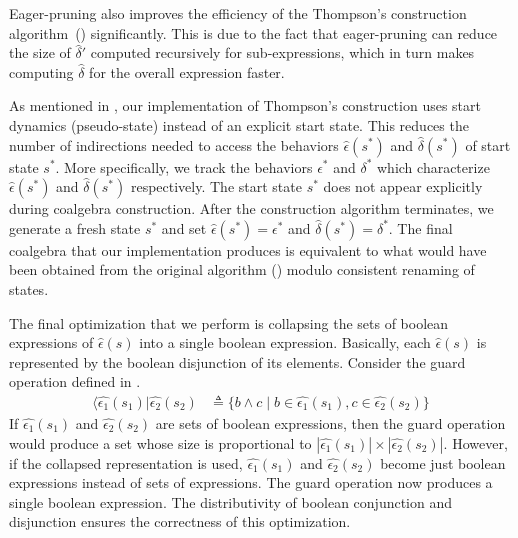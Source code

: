 \documentclass[conference]{IEEEtran}
\begin{document}
Eager-pruning also improves the efficiency of the Thompson's construction algorithm~() significantly. This is due to the fact that eager-pruning can reduce the size of \(\hat{\delta}'\) computed recursively for sub-expressions, which in turn makes computing \(\hat{\delta}\) for the overall expression faster.

As mentioned in , our implementation of Thompson's construction uses start dynamics (pseudo-state) instead of an explicit start state. This reduces the number of indirections needed to access the behaviors \(\hat{\epsilon}(s^*) \) and \(\hat{\delta}(s^*)\) of start state \(s^*\). More specifically, we track the behaviors \(\epsilon^*\) and \(\delta^*\) which characterize \(\hat{\epsilon}(s^*) \) and \(\hat{\delta}(s^*)\) respectively. The start state \(s^*\) does not appear explicitly during coalgebra construction. After the construction algorithm terminates, we generate a fresh state \(s^*\) and set \(\hat{\epsilon}(s^*) = \epsilon^*\) and \(\hat{\delta}(s^*) = \delta^*\). The final coalgebra that our implementation produces is equivalent to what would have been obtained from the original algorithm () modulo consistent renaming of states.

The final optimization that we perform is collapsing the sets of boolean expressions of \(\hat{\epsilon}(s)\) into a single boolean expression. Basically, each \(\hat{\epsilon}(s)\) is represented by the boolean disjunction of its elements. Consider the guard operation defined in .
\begin{align*}
    ⟨\hat{\epsilon_1}(s_1)|\hat{\epsilon_2}(s_2) & ≜ \{b ∧ c ∣ b ∈ \hat{\epsilon_1}(s_1), c ∈ \hat{\epsilon_2}(s_2)\}
\end{align*}
If \(\hat{\epsilon_1}(s_1)\) and \(\hat{\epsilon_2}(s_2)\) are sets of boolean expressions, then the guard operation would produce a set whose size is proportional to \(|\hat{\epsilon_1}(s_1)| \times |\hat{\epsilon_2}(s_2)|\). However, if the collapsed representation is used, \(\hat{\epsilon_1}(s_1)\) and \(\hat{\epsilon_2}(s_2)\) become just boolean expressions instead of sets of expressions. The guard operation now produces a single boolean expression. The distributivity of boolean conjunction and disjunction ensures the correctness of this optimization.
\end{document}
